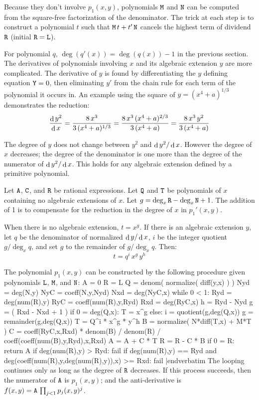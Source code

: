 Because they don't involve $p_1(x,y)$, polynomials ${\tt{M}}$ and
${\tt{N}}$ can be computed from the square-free factorization of the
denominator.  The trick at each step is to construct a polynomial
$t$ such that ${\tt{M}}\,t+t'\,{\tt{N}}$ cancels the
highest term of dividend ${\tt{R}}$ (initial ${\tt{R}}={\tt{L}}$).

For polynomial $q$, $\deg(q'(x))=\deg(q(x))-1$ in the previous
section.  The derivatives of polynomials involving $x$ and its
algebraic extension $y$ are more complicated.  The derivative of
$y$ is found by differentiating the $y$ defining equation
${\tt{Y}}=0$, then eliminating $y'$ from the chain rule for each term
of the polynomial it occurs in.  An example using the square of
$y=(x^4+a)^{1/3}$ demonstrates the reduction:
$${\mathop{\rm d}\nolimits{y^2}\over \mathop{\rm d}\nolimits{x}}=
  {8\,x^3\over3\,(x^4+a)^{1/3}}=
  {8\,x^3\,(x^4+a)^{2/3}\over3\,(x^4+a)}=
  {8\,x^3\,y^2\over3\,(x^4+a)}$$

The degree of $y$ does not change between $y^2$ and $\mathop{\rm d}\nolimits{y^2}/\mathop{\rm d}\nolimits{x}$.
However the degree of $x$ decreases; the degree of the denominator is
one more than the degree of the numerator of $\mathop{\rm d}\nolimits{y^2}/\mathop{\rm d}\nolimits{x}$.  This holds
for any algebraic extension defined by a primitive polynomial.

Let ${\tt{A}}$, ${\tt{C}}$, and ${\tt{R}}$ be rational expressions.
Let ${\tt{Q}}$ and ${\tt{T}}$ be polynomials of $x$ containing no
algebraic extensions of $x$.  Let $g=\deg_x{\tt{R}}-\deg_x{\tt{N}}+1$.
The addition of 1 is to compensate for the reduction in the degree of
$x$ in $p_1'(x,y)$.

When there is no algebraic extension, $t=x^g$.  If there is an
algebraic extension $y$, let $q$ be the denominator of normalized
${\mathop{\rm d}\nolimits{y}/\mathop{\rm d}\nolimits{x}}$, $i$ be the integer quotient ${g/\deg_x{q}}$, and set
$g$ to the remainder of ${g/\deg_x{q}}$.  Then:
$$t=q^i\,x^g\,y^h$$


The polynomial $p_1(x,y)$ can be constructed by the following
procedure given polynomials ${\tt{L}}$, ${\tt{M}}$, and ${\tt{N}}$:
\medskip
\verbatim
A = 0
R = L
Q = denom( normalize( diff(y,x) ) )
Nyd = deg(N,y)
NyC = coeff(N,y,Nyd)
Nxd = deg(NyC,x)
while 0 < 1:
    Ryd = deg(num(R),y)
    RyC = coeff(num(R),y,Ryd)
    Rxd = deg(RyC,x)
    h = Ryd - Nyd
    g = ( Rxd - Nxd + 1 )
    if 0 = deg(Q,x):
        T = x^g
    else:
        i = quotient(g,deg(Q,x))
        g = remainder(g,deg(Q,x))
        T = Q^i * x^g * y^h
    B = normalize( N*diff(T,x) + M*T )
    C = coeff(RyC,x,Rxd) * denom(B) / denom(R) /
        coeff(coeff(num(B),y,Ryd),x,Rxd)
    A = A + C * T
    R = R - C * B
    if 0 = R:
        return A
    if deg(num(R),y) > Ryd:
        fail
    if deg(num(R),y) == Ryd and
       deg(coeff(num(R),y,deg(num(R),y)),x) >= Rxd:
        fail
|endverbatim
\medskip
The looping continues only as long as the degree of ${\tt{R}}$
decreases.  If this process succeeds, then the numerator of ${\tt{A}}$
is $p_1(x,y)$; and the anti-derivative is
$f(x,y)={\tt{A}}\,\prod_{j<1}p_j(x,y)^j$.


